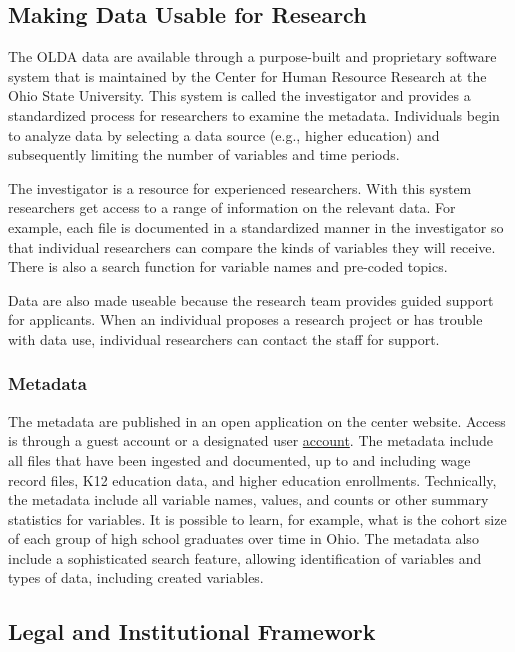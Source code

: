 \documentclass[
]{WileySix}
\begin{document}
\hypertarget{making-data-usable-for-research-1}{%
\subsection{Making Data Usable for Research}\label{making-data-usable-for-research-1}}

The OLDA data are available through a purpose-built and proprietary software system that is maintained by the Center for Human Resource Research at the Ohio State University. This system is called the investigator and provides a standardized process for researchers to examine the metadata. Individuals begin to analyze data by selecting a data source (e.g., higher education) and subsequently limiting the number of variables and time periods.

The investigator is a resource for experienced researchers. With this system researchers get access to a range of information on the relevant data. For example, each file is documented in a standardized manner in the investigator so that individual researchers can compare the kinds of variables they will receive. There is also a search function for variable names and pre-coded topics.

Data are also made useable because the research team provides guided support for applicants. When an individual proposes a research project or has trouble with data use, individual researchers can contact the staff for support.

\hypertarget{metadata}{%
\subsubsection{Metadata}\label{metadata}}

The metadata are published in an open application on the center website. Access is through a guest account or a designated user \href{https://www.chrr.ohio-state.edu/investigator/pages/login}{account}. The metadata include all files that have been ingested and documented, up to and including wage record files, K12 education data, and higher education enrollments. Technically, the metadata include all variable names, values, and counts or other summary statistics for variables. It is possible to learn, for example, what is the cohort size of each group of high school graduates over time in Ohio. The metadata also include a sophisticated search feature, allowing identification of variables and types of data, including created variables.

\hypertarget{legal-and-institutional-framework-1}{%
\subsection{Legal and Institutional Framework}\label{legal-and-institutional-framework-1}}
\end{document}
